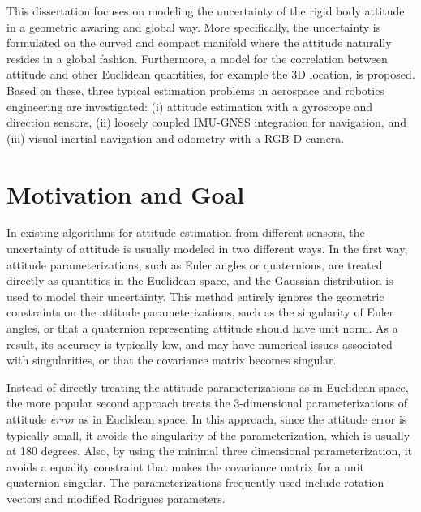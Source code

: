This dissertation focuses on modeling the uncertainty of the rigid body attitude in a geometric awaring and global way.
More specifically, the uncertainty is formulated on the curved and compact manifold where the attitude naturally resides in a global fashion.
Furthermore, a model for the correlation between attitude and other Euclidean quantities, for example the 3D location, is proposed.
Based on these, three typical estimation problems in aerospace and robotics engineering are investigated: (i) attitude estimation with a gyroscope and direction sensors, (ii) loosely coupled IMU-GNSS integration for navigation, and (iii) visual-inertial navigation and odometry with a RGB-D camera. 

\section{Motivation and Goal}

In existing algorithms for attitude estimation from different sensors, the uncertainty of attitude is usually modeled in two different ways.
In the first way, attitude parameterizations, such as Euler angles or quaternions, are treated directly as quantities in the Euclidean space, and the Gaussian distribution is used to model their uncertainty.
This method entirely ignores the geometric constraints on the attitude parameterizations, such as the singularity of Euler angles, or that a quaternion representing attitude should have unit norm.
As a result, its accuracy is typically low, and may have numerical issues associated with singularities, or that the covariance matrix becomes singular.

Instead of directly treating the attitude parameterizations as in Euclidean space, the more popular second approach treats the 3-dimensional parameterizations of attitude \textit{error} as in Euclidean space.
In this approach, since the attitude error is typically small, it avoids the singularity of the parameterization, which is usually at 180 degrees.
Also, by using the minimal three dimensional parameterization, it avoids a equality constraint that makes the covariance matrix for a unit quaternion singular.
The parameterizations frequently used include rotation vectors and modified Rodrigues parameters.

